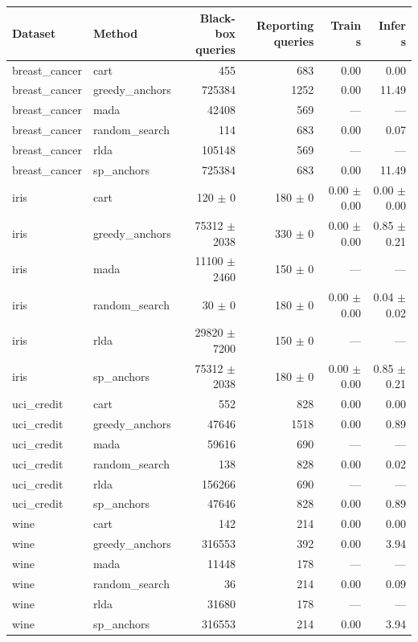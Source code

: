 \begin{tabular}{llrrrr}
\toprule
Dataset & Method & Black-box queries & Reporting queries & Train s & Infer s \\
\midrule
breast_cancer & cart & 455 & 683 & 0.00 & 0.00 \\
breast_cancer & greedy_anchors & 725384 & 1252 & 0.00 & 11.49 \\
breast_cancer & mada & 42408 & 569 & — & — \\
breast_cancer & random_search & 114 & 683 & 0.00 & 0.07 \\
breast_cancer & rlda & 105148 & 569 & — & — \\
breast_cancer & sp_anchors & 725384 & 683 & 0.00 & 11.49 \\
iris & cart & 120 $\pm$ 0 & 180 $\pm$ 0 & 0.00 $\pm$ 0.00 & 0.00 $\pm$ 0.00 \\
iris & greedy_anchors & 75312 $\pm$ 2038 & 330 $\pm$ 0 & 0.00 $\pm$ 0.00 & 0.85 $\pm$ 0.21 \\
iris & mada & 11100 $\pm$ 2460 & 150 $\pm$ 0 & — & — \\
iris & random_search & 30 $\pm$ 0 & 180 $\pm$ 0 & 0.00 $\pm$ 0.00 & 0.04 $\pm$ 0.02 \\
iris & rlda & 29820 $\pm$ 7200 & 150 $\pm$ 0 & — & — \\
iris & sp_anchors & 75312 $\pm$ 2038 & 180 $\pm$ 0 & 0.00 $\pm$ 0.00 & 0.85 $\pm$ 0.21 \\
uci_credit & cart & 552 & 828 & 0.00 & 0.00 \\
uci_credit & greedy_anchors & 47646 & 1518 & 0.00 & 0.89 \\
uci_credit & mada & 59616 & 690 & — & — \\
uci_credit & random_search & 138 & 828 & 0.00 & 0.02 \\
uci_credit & rlda & 156266 & 690 & — & — \\
uci_credit & sp_anchors & 47646 & 828 & 0.00 & 0.89 \\
wine & cart & 142 & 214 & 0.00 & 0.00 \\
wine & greedy_anchors & 316553 & 392 & 0.00 & 3.94 \\
wine & mada & 11448 & 178 & — & — \\
wine & random_search & 36 & 214 & 0.00 & 0.09 \\
wine & rlda & 31680 & 178 & — & — \\
wine & sp_anchors & 316553 & 214 & 0.00 & 3.94 \\
\bottomrule
\end{tabular}
